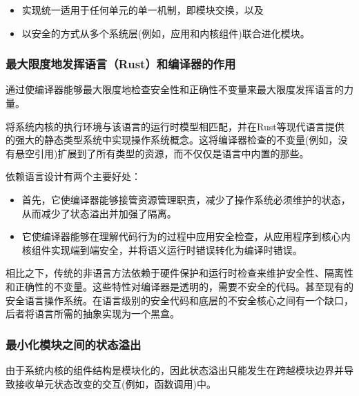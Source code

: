 \begin{itemize}
	\item 实现统一适用于任何单元的单一机制，即模块交换，以及
	\item 以安全的方式从多个系统层(例如，应用和内核组件)联合进化模块。
\end{itemize}

\subsubsection{最大限度地发挥语言（Rust）和编译器的作用}
通过使编译器能够最大限度地检查安全性和正确性不变量来最大限度发挥语言的力量。

将系统内核的执行环境与该语言的运行时模型相匹配，并在Rust等现代语言提供的强大的静态类型系统中实现操作系统概念。这将编译器检查的不变量(例如，没有悬空引用)扩展到了所有类型的资源，而不仅仅是语言中内置的那些。

依赖语言设计有两个主要好处：

\begin{itemize}
    \item 首先，它使编译器能够接管资源管理职责，减少了操作系统必须维护的状态，从而减少了状态溢出并加强了隔离。
    \item 它使编译器能够在理解代码行为的过程中应用安全检查，从应用程序到核心内核组件实现端到端安全，并将语义运行时错误转化为编译时错误。
\end{itemize}

相比之下，传统的非语言方法依赖于硬件保护和运行时检查来维护安全性、隔离性和正确性的不变量。这些特性对编译器是透明的，需要不安全的代码。甚至现有的安全语言操作系统。在语言级别的安全代码和底层的不安全核心之间有一个缺口，后者将语言所需的抽象实现为一个黑盒。

\subsubsection{最小化模块之间的状态溢出}

由于系统内核的组件结构是模块化的，因此状态溢出只能发生在跨越模块边界并导致接收单元状态改变的交互(例如，函数调用)中。

